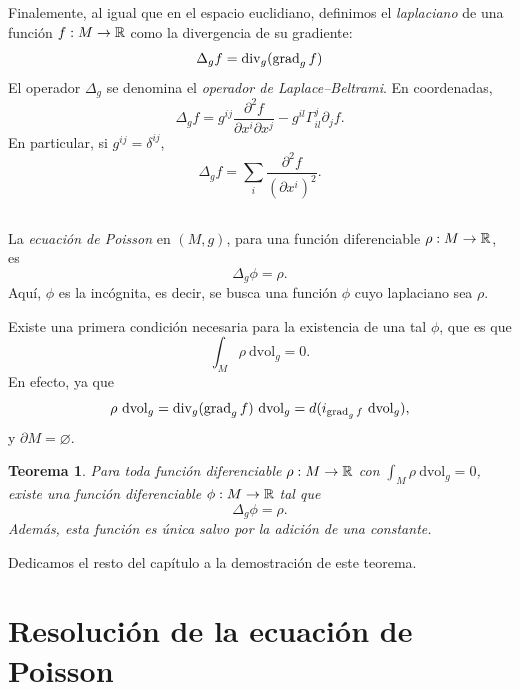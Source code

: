 \documentclass[11pt,a4paper]{amsbook}
\newtheorem{thm}[subsection]{Teorema}
\theoremstyle{remark} \newtheorem{rmk}[subsection]{Observación}
\theoremstyle{definition} \newtheorem{defn}[subsection]{Definición}
\theoremstyle{definition} \newtheorem{ex}[subsection]{Ejemplo}
\theoremstyle{definition} \newtheorem{ej}[subsection]{Ejercicio}
\begin{document}
Finalemente, al igual que en el espacio euclidiano, definimos el \emph{laplaciano} de una función $f:M\rightarrow \mathbb R$ como la divergencia de su gradiente:
\begin{equation*}
\Delta_g f = \operatorname{div}_g (\operatorname{grad}_g f)
\end{equation*}
El operador $\Delta_g$ se denomina el \emph{operador de Laplace--Beltrami}.
En coordenadas,
\begin{equation*}
\Delta_g f = g^{ij} \frac{\partial^2 f}{\partial x^i \partial x^j} - g^{il} \Gamma^j_{il} \partial_j f.
\end{equation*}
En particular, si $g^{ij}=\delta^{ij}$,
\begin{equation*}
\Delta_g f = \sum_{i} \frac{\partial^2 f}{(\partial x^i)^2}.
\end{equation*}

\subsection{} La \emph{ecuación de Poisson} en $(M,g)$, para una función diferenciable $\rho:M\rightarrow \mathbb R$, es
\begin{equation*}
\Delta_g \phi = \rho.
\end{equation*}
Aquí, $\phi$ es la incógnita, es decir, se busca una función $\phi$ cuyo laplaciano sea $\rho$.

Existe una primera condición necesaria para la existencia de una tal $\phi$, que es que
\begin{equation*}
\int_M \rho\ \mathrm{dvol}_g = 0.
\end{equation*}
En efecto, ya que
\begin{equation*}
\rho\ \mathrm{dvol}_g = \Div_g (\grad_g f)\ \mathrm{dvol}_g = d(i_{\grad_g f}\ \mathrm{dvol}_g),
\end{equation*}
y $\partial M = \varnothing$.

\begin{thm}
Para toda función diferenciable $\rho:M\rightarrow \mathbb R$ con $\int_M \rho\ \mathrm{dvol}_g = 0$, existe una función diferenciable $\phi:M\rightarrow \mathbb R$ tal que
\begin{equation*}
\Delta_g \phi = \rho.
\end{equation*}
Además, esta función es única salvo por la adición de una constante.
\end{thm}

Dedicamos el resto del capítulo a la demostración de este teorema.

\section{Resolución de la ecuación de Poisson}
\end{document}
